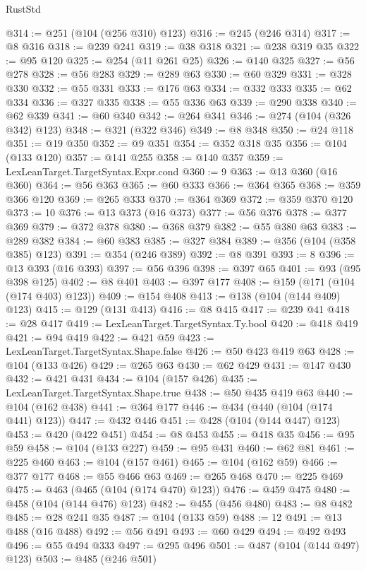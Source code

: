 \begin{lexlean}{RustStd}
\begin{coremodule}
@314 := @251 (@104 (@256 @310) @123)
@316 := @245 (@246 @314)
@317 := @8 @316
@318 := @239 @241
@319 := @38 @318
@321 := @238 @319 @35
@322 := @95 @120
@325 := @254 (@11 @261 @25)
@326 := @140 @325
@327 := @56 @278
@328 := @56 @283
@329 := @289 @63
@330 := @60 @329
@331 := @328 @330
@332 := @55 @331
@333 := @176 @63
@334 := @332 @333
@335 := @62 @334
@336 := @327 @335
@338 := @55 @336 @63
@339 := @290 @338
@340 := @62 @339
@341 := @60 @340
@342 := @264 @341
@346 := @274 (@104 (@326 @342) @123)
@348 := @321 (@322 @346)
@349 := @8 @348
@350 := @24 @118
@351 := @19 @350
@352 := @9 @351
@354 := @352 @318 @35
@356 := @104 (@133 @120)
@357 := @141 @255
@358 := @140 @357
@359 := LexLeanTarget.TargetSyntax.Expr.cond
@360 := 9
@363 := @13 @360 (@16 @360)
@364 := @56 @363
@365 := @60 @333
@366 := @364 @365
@368 := @359 @366 @120
@369 := @265 @333
@370 := @364 @369
@372 := @359 @370 @120
@373 := 10
@376 := @13 @373 (@16 @373)
@377 := @56 @376
@378 := @377 @369
@379 := @372 @378
@380 := @368 @379
@382 := @55 @380 @63
@383 := @289 @382
@384 := @60 @383
@385 := @327 @384
@389 := @356 (@104 (@358 @385) @123)
@391 := @354 (@246 @389)
@392 := @8 @391
@393 := 8
@396 := @13 @393 (@16 @393)
@397 := @56 @396
@398 := @397 @65
@401 := @93 (@95 @398 @125)
@402 := @8 @401
@403 := @397 @177
@408 := @159 (@171 (@104 (@174 @403) @123))
@409 := @154 @408
@413 := @138 (@104 (@144 @409) @123)
@415 := @129 (@131 @413)
@416 := @8 @415
@417 := @239 @41
@418 := @28 @417
@419 := LexLeanTarget.TargetSyntax.Ty.bool
@420 := @418 @419
@421 := @94 @419
@422 := @421 @59
@423 := LexLeanTarget.TargetSyntax.Shape.false
@426 := @50 @423 @419 @63
@428 := @104 (@133 @426)
@429 := @265 @63
@430 := @62 @429
@431 := @147 @430
@432 := @421 @431
@434 := @104 (@157 @426)
@435 := LexLeanTarget.TargetSyntax.Shape.true
@438 := @50 @435 @419 @63
@440 := @104 (@162 @438)
@441 := @364 @177
@446 := @434 (@440 (@104 (@174 @441) @123))
@447 := @432 @446
@451 := @428 (@104 (@144 @447) @123)
@453 := @420 (@422 @451)
@454 := @8 @453
@455 := @418 @35
@456 := @95 @59
@458 := @104 (@133 @227)
@459 := @95 @431
@460 := @62 @81
@461 := @225 @460
@463 := @104 (@157 @461)
@465 := @104 (@162 @59)
@466 := @377 @177
@468 := @55 @466 @63
@469 := @265 @468
@470 := @225 @469
@475 := @463 (@465 (@104 (@174 @470) @123))
@476 := @459 @475
@480 := @458 (@104 (@144 @476) @123)
@482 := @455 (@456 @480)
@483 := @8 @482
@485 := @28 @241 @35
@487 := @104 (@133 @59)
@488 := 12
@491 := @13 @488 (@16 @488)
@492 := @56 @491
@493 := @60 @429
@494 := @492 @493
@496 := @55 @494 @333
@497 := @295 @496
@501 := @487 (@104 (@144 @497) @123)
@503 := @485 (@246 @501)

\end{coremodule}
\end{lexlean}
